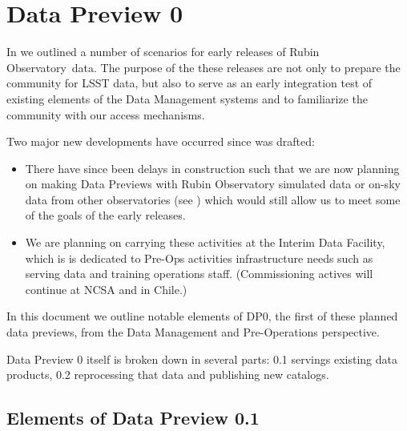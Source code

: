\section{Data Preview 0}\label{sec:dp0}

In  we outlined a number of scenarios for early releases of Rubin Observatory~data. The purpose of the these releases are not only to prepare the community for LSST data, but also to serve as an early integration test of existing elements of the Data Management systems and to familiarize the community with our access mechanisms.

Two major new developments have occurred since  was drafted:

\begin{itemize}

\item There have since been delays in construction such that we are now planning on making Data Previews with Rubin Observatory simulated data or on-sky data from other observatories (see ) which would still allow us to meet some of the goals of the early releases.

\item We are planning on carrying these activities at the Interim Data Facility, which is is dedicated to Pre-Ops activities infrastructure needs such as serving data and training operations staff. (Commissioning actives will continue at NCSA and in Chile.)

\end{itemize}

In this document we outline notable elements of DP0, the first of these planned data previews, from the Data Management and Pre-Operations perspective.

Data Preview 0 itself is broken down in several parts: 0.1 servings existing data products, 0.2 reprocessing that data and publishing new catalogs.

\subsection{Elements of Data Preview 0.1}



